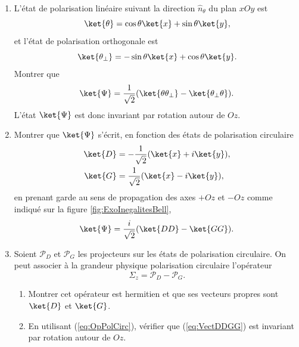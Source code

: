 \begin{enumerate}
\item L'état de polarisation linéaire suivant la direction $\hat{n}_{\theta}$
du plan $xOy$ est%
\begin{equation}
\ket{\theta}=\cos\theta\ket{x}+\sin\theta\ket{y},
\end{equation}
et l'état de polarisation orthogonale est
\begin{equation}
\ket{\theta_{\bot}}=-\sin\theta\ket{x}+\cos\theta\ket{y}.
\end{equation}
Montrer que%
\begin{equation}
\ket{\Psi}=\frac{1}{\sqrt{2}}(\ket{\theta\theta_{\bot}}-\ket{\theta_{\bot}
\theta}).
\end{equation}
L'état $\ket{\Psi}$ est donc invariant par rotation autour de $Oz$.

\item Montrer que $\ket{\Psi}$ s'écrit, en fonction des états de polarisation
circulaire%
\begin{subequations}
\begin{align}
\ket{D}&  =-\frac{1}{\sqrt{2}}(\ket{x}+i\ket{y}),\\
\ket{G}&  =\frac{1}{\sqrt{2}}(\ket{x}-i\ket{y}),
\end{align}%
\end{subequations}%
en prenant garde au sens de propagation des axes $+Oz$ et $-Oz$ comme indiqué
sur la figure \ref{fig:ExoInegalitesBell},
\begin{equation}
 \ket{\Psi}=\frac{i}{\sqrt{2}}(\ket{DD}-\ket{GG}).
\label{eq:VectDDGG}%
\end{equation}

\item Soient $\mathcal{P}_{D}$ et $\mathcal{P}_{G}$ les projecteurs sur les
états de polarisation circulaire. On peut associer à la grandeur physique
polarisation circulaire l'opérateur
\begin{equation}
\Sigma_{z}=\mathcal{P}_{D}-\mathcal{P}_{G}.
\label{eq:OpPolCirc}%
\end{equation}

\begin{enumerate}
\item Montrer cet opérateur est hermitien et que ses vecteurs propres sont
$\ket{D}$ et $\ket{G}$.

\item En utilisant (\ref{eq:OpPolCirc}), vérifier que (\ref{eq:VectDDGG}) est
invariant par rotation autour de $Oz$.
\end{enumerate}


\end{enumerate}
